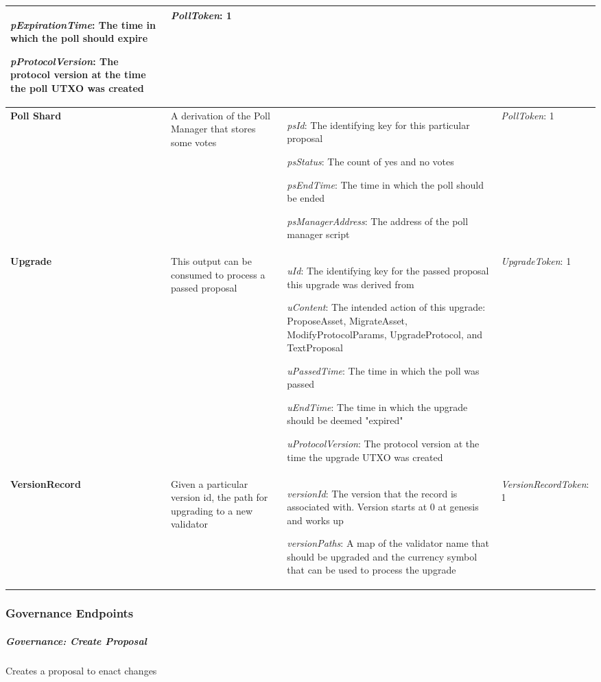 \documentclass{article}
\begin{document}
\begin{sloppypar}
\begin{tabularx}{\linewidth}{l|L|L|l}
\emph{pExpirationTime}: The time in which the poll should expire

\emph{pProtocolVersion}: The protocol version at the time the poll UTXO
was created
&
\emph{PollToken}: 1
\tabularnewline
\midrule
\textbf{Poll Shard}
&
A derivation of the Poll Manager that stores some votes
&
\emph{psId}: The identifying key for this particular proposal

\emph{psStatus}: The count of yes and no votes

\emph{psEndTime}: The time in which the poll should be ended

\emph{psManagerAddress}: The address of the poll manager script
&
\emph{PollToken}: 1
\tabularnewline
\midrule
\textbf{Upgrade}
&
This output can be consumed to process a passed proposal
&
\emph{uId}: The identifying key for the passed proposal this upgrade was
derived from

\emph{uContent}: The intended action of this upgrade: ProposeAsset,
MigrateAsset, ModifyProtocolParams, UpgradeProtocol, and TextProposal

\emph{uPassedTime}: The time in which the poll was passed

\emph{uEndTime}: The time in which the upgrade should be deemed
"expired"

\emph{uProtocolVersion}: The protocol version at the time the upgrade
UTXO was created
&
\emph{UpgradeToken}: 1
\tabularnewline
\midrule
\textbf{VersionRecord}
&
Given a particular version id, the path for upgrading to a new
validator
&
\emph{versionId}: The version that the record is associated with.
Version starts at 0 at genesis and works up

\emph{versionPaths}: A map of the validator name that should be upgraded
and the currency symbol that can be used to process the upgrade
&
\emph{VersionRecordToken}: 1
\tabularnewline
\bottomrule
\end{tabularx}

\hypertarget{governance-endpoints}{%
\subsubsection{Governance Endpoints}\label{governance-endpoints}}

\hypertarget{governance-create-proposal}{%
\subparagraph{Governance: Create
Proposal}\label{governance-create-proposal}}

Creates a proposal to enact changes


\end{sloppypar}
\end{document}
